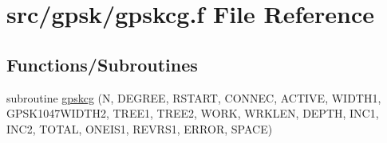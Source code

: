 \hypertarget{gpskcg_8f}{\section{src/gpsk/gpskcg.f File Reference}
\label{gpskcg_8f}
}
\subsection*{Functions/\-Subroutines}
\begin{DoxyCompactItemize}
\item 
subroutine \hyperlink{gpskcg_8f_ac858ff36b2f458f7d858f4da8a4fa20b}{gpskcg} (N, D\-E\-G\-R\-E\-E, R\-S\-T\-A\-R\-T, C\-O\-N\-N\-E\-C, A\-C\-T\-I\-V\-E, W\-I\-D\-T\-H1, G\-P\-S\-K1047\-W\-I\-D\-T\-H2, T\-R\-E\-E1, T\-R\-E\-E2, W\-O\-R\-K, W\-R\-K\-L\-E\-N, D\-E\-P\-T\-H, I\-N\-C1, I\-N\-C2, T\-O\-T\-A\-L, O\-N\-E\-I\-S1, R\-E\-V\-R\-S1, E\-R\-R\-O\-R, S\-P\-A\-C\-E)
\end{DoxyCompactItemize}


